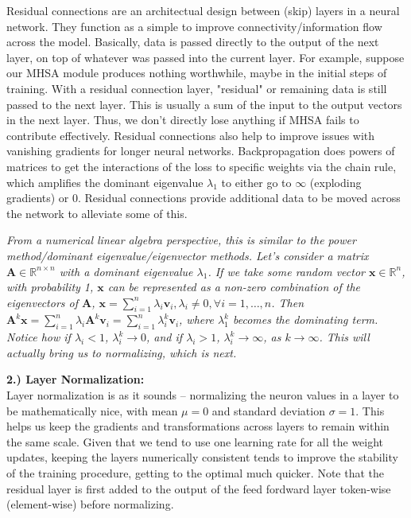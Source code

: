 \documentclass[11pt]{article}
\newcommand{\vv}{{\mathbf{v}}}
\newcommand{\vx}{{\mathbf{x}}}
\newcommand{\vA}{{\mathbf{A}}}
\newcommand{\RR}{\mathbb{R}} %
\begin{document}
Residual connections are an architectual design between (skip) layers in a neural network. They function as a simple to improve connectivity/information flow across the model. Basically, data is passed directly to the output of the next layer, on top of whatever was passed into the current layer. For example, suppose our MHSA module produces nothing worthwhile, maybe in the initial steps of training. With a residual connection layer, "residual" or remaining data is still passed to the next layer. This is usually a sum of the input to the output vectors in the next layer. Thus, we don't directly lose anything if MHSA fails to contribute effectively. Residual connections also help to improve issues with vanishing gradients for longer neural networks. Backpropagation does powers of matrices to get the interactions of the loss to specific weights via the chain rule, which amplifies the dominant eigenvalue $\lambda_1$ to either go to $\infty$ (exploding gradients) or 0. Residual connections provide additional data to be moved across the network to alleviate some of this.

\textit{From a numerical linear algebra perspective, this is similar to the power method/dominant eigenvalue/eigenvector methods. Let's consider a matrix $\vA \in \RR^{n\times n}$ with a dominant eigenvalue $\lambda_1$. If we take some random vector $\vx \in \RR^n$, with probability 1, $\vx$ can be represented as a non-zero combination of the eigenvectors of $\vA$, $\vx = \sum_{i=1}^{n}\lambda_i\vv_i, \lambda_i \neq 0, \forall i = 1, \dots, n$. Then $\vA^k\vx = \sum_{i=1}^{n}\lambda_i\vA^k\vv_i = \sum_{i=1}^{n}\lambda_i^k\vv_i$, where $\lambda_1^k$ becomes the dominating term. Notice how if $\lambda_i < 1$, $\lambda_i^k \rightarrow 0$, and if $\lambda_i > 1$, $\lambda_i^k \rightarrow \infty$, as $k \rightarrow \infty$. This will actually bring us to normalizing, which is next.}

\textbf{2.) Layer Normalization:}\\

Layer normalization is as it sounds -- normalizing the neuron values in a layer to be mathematically nice, with mean $\mu = 0$ and standard deviation $\sigma = 1$. This helps us keep the gradients and transformations across layers to remain within the same scale. Given that we tend to use one learning rate for all the weight updates, keeping the layers numerically consistent tends to improve the stability of the training procedure, getting to the optimal much quicker. Note that the residual layer is first added to the output of the feed fordward layer token-wise (element-wise) before normalizing. 
\end{document}
